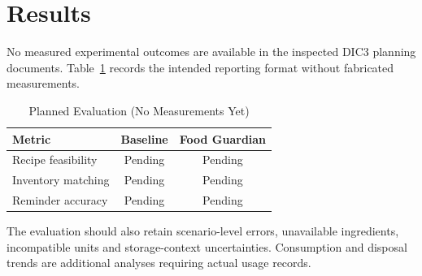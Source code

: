 \section{Results}
No measured experimental outcomes are available in the inspected DIC3 planning documents. Table~\ref{tab:results} records the intended reporting format without fabricated measurements.
\begin{table}[h]
\caption{Planned Evaluation (No Measurements Yet)}\label{tab:results}\centering
\begin{tabular}{lcc}\toprule
Metric & Baseline & Food Guardian\\\midrule
Recipe feasibility & Pending & Pending\\
Inventory matching & Pending & Pending\\
Reminder accuracy & Pending & Pending\\\bottomrule
\end{tabular}\end{table}
The evaluation should also retain scenario-level errors, unavailable ingredients, incompatible units and storage-context uncertainties. Consumption and disposal trends are additional analyses requiring actual usage records.
